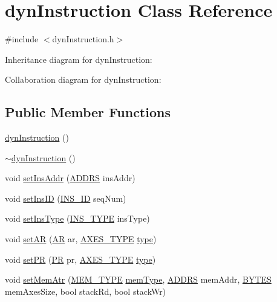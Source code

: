 \hypertarget{classdynInstruction}{
\section{dynInstruction Class Reference}
\label{classdynInstruction}
}


{\ttfamily \#include $<$dynInstruction.h$>$}



Inheritance diagram for dynInstruction:


Collaboration diagram for dynInstruction:
\subsection*{Public Member Functions}
\begin{DoxyCompactItemize}
\item 
\hyperlink{classdynInstruction_a0f3a48343375c9e3205b7c09127e95f9}{dynInstruction} ()
\item 
\hyperlink{classdynInstruction_a133d35bbe8cd2afdf8f7c9618beb3759}{$\sim$dynInstruction} ()
\item 
void \hyperlink{classdynInstruction_a0088b0057fb6a8dd41dee05d79387f7c}{setInsAddr} (\hyperlink{global_2global_8h_a7ea74bb9ffd2e4d41550ae2383dd25bc}{ADDRS} insAddr)
\item 
void \hyperlink{classdynInstruction_a47de890f2ae5bb33e384a7c21a54fbec}{setInsID} (\hyperlink{global_2global_8h_a1883c47d0023d0f200e1d86eced6a070}{INS\_\-ID} seqNum)
\item 
void \hyperlink{classdynInstruction_ae7c165e2f688432713ea575b2a5477fe}{setInsType} (\hyperlink{binaryTranslator_2global_8h_a7aead736a07eaf25623ad7bfa1f0ee2d}{INS\_\-TYPE} insType)
\item 
void \hyperlink{classdynInstruction_a27b7ba0720a85d516c3885bddf154765}{setAR} (\hyperlink{global_2global_8h_a735ca3cb7fa17e60af6701a846722516}{AR} ar, \hyperlink{binaryTranslator_2global_8h_a94b8423a23b95a7adac22848b81e7c0c}{AXES\_\-TYPE} \hyperlink{binaryTranslator_2global_8h_a7aead736a07eaf25623ad7bfa1f0ee2d}{type})
\item 
void \hyperlink{classdynInstruction_a86ac41fe463dde2aee30a22d8bc243ad}{setPR} (\hyperlink{global_2global_8h_a54dcae2ba04c76c12afe113b706bd4dc}{PR} pr, \hyperlink{binaryTranslator_2global_8h_a94b8423a23b95a7adac22848b81e7c0c}{AXES\_\-TYPE} \hyperlink{binaryTranslator_2global_8h_a7aead736a07eaf25623ad7bfa1f0ee2d}{type})
\item 
void \hyperlink{classdynInstruction_a5751f811a01cf9f08e0b964db98a7c0e}{setMemAtr} (\hyperlink{global_2global_8h_a40bc49627faaf5adeed28388c6ffae9c}{MEM\_\-TYPE} \hyperlink{binaryTranslator_2global_8h_a94b8423a23b95a7adac22848b81e7c0c}{memType}, \hyperlink{global_2global_8h_a7ea74bb9ffd2e4d41550ae2383dd25bc}{ADDRS} memAddr, \hyperlink{global_2global_8h_a430d9e51ff815ddfce06905ae7392e83}{BYTES} memAxesSize, bool stackRd, bool stackWr)

\end{DoxyCompactItemize}
